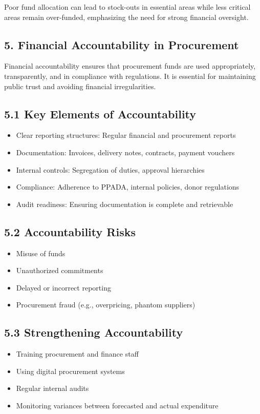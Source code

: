 \documentclass[10pt]{article}
\begin{document}
Poor fund allocation can lead to stock-outs in essential areas while less critical areas remain over-funded, emphasizing the need for strong financial oversight.

\subsection*{5. Financial Accountability in Procurement}
Financial accountability ensures that procurement funds are used appropriately, transparently, and in compliance with regulations. It is essential for maintaining public trust and avoiding financial irregularities.

\subsection*{5.1 Key Elements of Accountability}
\begin{itemize}
  \item Clear reporting structures: Regular financial and procurement reports
  \item Documentation: Invoices, delivery notes, contracts, payment vouchers
  \item Internal controls: Segregation of duties, approval hierarchies
  \item Compliance: Adherence to PPADA, internal policies, donor regulations
  \item Audit readiness: Ensuring documentation is complete and retrievable
\end{itemize}

\subsection*{5.2 Accountability Risks}
\begin{itemize}
  \item Misuse of funds
  \item Unauthorized commitments
  \item Delayed or incorrect reporting
  \item Procurement fraud (e.g., overpricing, phantom suppliers)
\end{itemize}

\subsection*{5.3 Strengthening Accountability}
\begin{itemize}
  \item Training procurement and finance staff
  \item Using digital procurement systems
  \item Regular internal audits
  \item Monitoring variances between forecasted and actual expenditure
\end{itemize}
\end{document}

